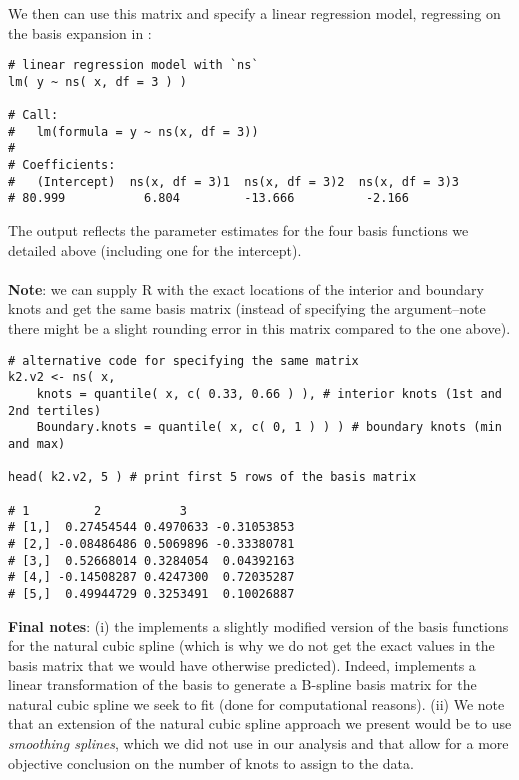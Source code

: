 \documentclass{article}
\begin{document}
\noindent We then can use this matrix and specify a linear regression model, regressing  {} on the basis expansion in  {}:

 \vspace{0.5cm}
 
\begin{lstlisting}
# linear regression model with `ns`
lm( y ~ ns( x, df = 3 ) )

# Call:
#   lm(formula = y ~ ns(x, df = 3))
# 
# Coefficients:
#   (Intercept)  ns(x, df = 3)1  ns(x, df = 3)2  ns(x, df = 3)3  
# 80.999           6.804         -13.666          -2.166  

\end{lstlisting}

 \vspace{0.5cm}
\noindent The output reflects the parameter estimates for the four basis functions we detailed above (including one for the intercept).\\
\\
\noindent \textbf{Note}: we can supply R with the exact locations of the interior and boundary knots and get the same basis matrix (instead of specifying the  {} argument--note there might be a slight rounding error in this matrix compared to the one above).

\vspace{0.5cm}
 
\begin{lstlisting}
# alternative code for specifying the same matrix
k2.v2 <- ns( x, 
    knots = quantile( x, c( 0.33, 0.66 ) ), # interior knots (1st and 2nd tertiles)
    Boundary.knots = quantile( x, c( 0, 1 ) ) ) # boundary knots (min and max)

head( k2.v2, 5 ) # print first 5 rows of the basis matrix

# 1         2           3
# [1,]  0.27454544 0.4970633 -0.31053853
# [2,] -0.08486486 0.5069896 -0.33380781
# [3,]  0.52668014 0.3284054  0.04392163
# [4,] -0.14508287 0.4247300  0.72035287
# [5,]  0.49944729 0.3253491  0.10026887
\end{lstlisting}

\noindent \textbf{Final notes}: (i) the {} implements a slightly modified version of the basis functions for the natural cubic spline (which is why we do not get the exact values in the basis matrix that we would have otherwise predicted). Indeed, {} implements a linear transformation of the basis to generate a B-spline basis matrix for the natural cubic spline we seek to fit (done for computational reasons). (ii) We note that an extension of the natural cubic spline approach we present would be to use \textit{smoothing splines}, which we did not use in our analysis and that allow for a more objective conclusion on the number of knots to assign to the data.\supercite{hastie_elements_2009}
\end{document}
